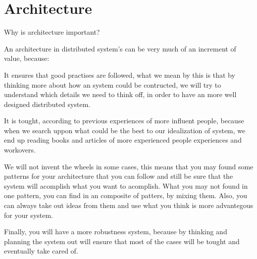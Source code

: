 \section{Architecture}
\quad Why is architecture important?

  An architecture in distributed system's can be very much of an increment of value, because:

  It ensures that good practises are followed, what we mean by this is that by thinking more about how an system could be contructed, we will try to understand which details we need to think off, in order to have an more well designed distributed system.

  It is tought, according to previous experiences of more influent people, because when we search uppon what could be the best to our idealization of system, we end up reading books and articles of more experienced people experiences and workovers.

  We will not invent the wheels in some cases, this means that you may found some patterns for your architecture that you can follow and still be sure that the system will acomplish what you want to acomplish. What you may not found in one pattern, you can find in an composite of patters, by mixing them. Also, you can always take out ideas from them and use what you think is more advantegous for your system.

  Finally, you will have a more robustness system, because by thinking and planning the system out will ensure that most of the cases will be tought and eventually take cared of.
  